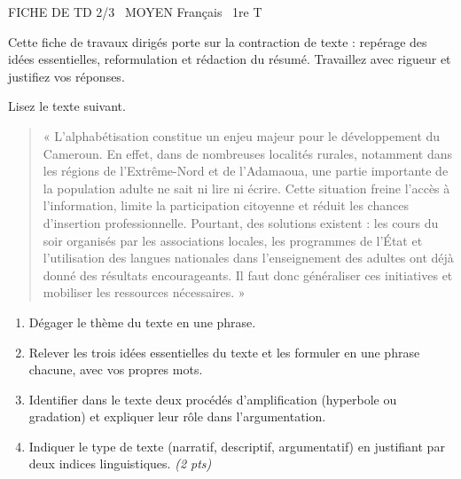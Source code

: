 \documentclass[11pt]{article}
\begin{document}
\begin{tcolorbox}[enhanced,colback=popink,colframe=popink,arc=10pt,boxrule=0pt,left=12pt,right=12pt,top=9pt,bottom=9pt]
{\color{white}\popxbold\small FICHE DE TD 2/3 \textbullet\ MOYEN \hfill Français \textbullet\ 1re T\par}
\end{tcolorbox}
\vspace{4pt}
Cette fiche de travaux dirigés porte sur la contraction de texte : repérage des idées essentielles, reformulation et rédaction du résumé. Travaillez avec rigueur et justifiez vos réponses.

\begin{exercice}
Lisez le texte suivant.

\begin{quote}
« L'alphabétisation constitue un enjeu majeur pour le développement du Cameroun. En effet, dans de nombreuses localités rurales, notamment dans les régions de l'Extrême-Nord et de l'Adamaoua, une partie importante de la population adulte ne sait ni lire ni écrire. Cette situation freine l'accès à l'information, limite la participation citoyenne et réduit les chances d'insertion professionnelle. Pourtant, des solutions existent : les cours du soir organisés par les associations locales, les programmes de l'État et l'utilisation des langues nationales dans l'enseignement des adultes ont déjà donné des résultats encourageants. Il faut donc généraliser ces initiatives et mobiliser les ressources nécessaires. »
\end{quote}

\begin{enumerate}
\item Dégager le thème du texte en une phrase.
\item Relever les trois idées essentielles du texte et les formuler en une phrase chacune, avec vos propres mots.
\item Identifier dans le texte deux procédés d'amplification (hyperbole ou gradation) et expliquer leur rôle dans l'argumentation.
\item Indiquer le type de texte (narratif, descriptif, argumentatif) en justifiant par deux indices linguistiques. \textit{(2 pts)}
\end{enumerate}
\end{exercice}
\end{document}

